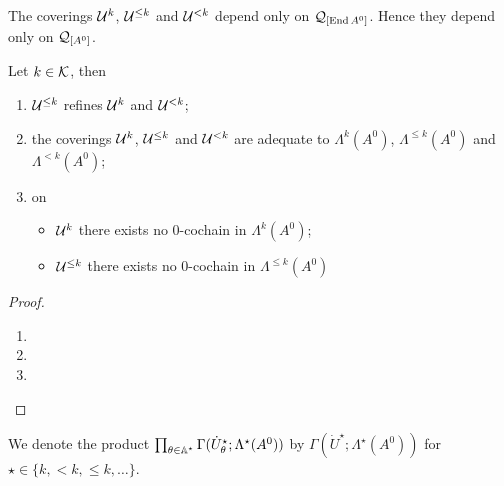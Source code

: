 \begin{rem}
  The coverings $\mathcal{U}^{k}$, $\mathcal{U}^{\leq k}$ and $\mathcal{U}^{<k}$ depend only on
  $\mathcal{Q}_{[\operatorname{End} A^0]}$. Hence they depend only on $\mathcal{Q}_{[A^0]}$.
\end{rem}
\begin{prop}
  Let $k\in\mathcal{K}$, then
  \begin{enumerate}
    \item $\mathcal{U}^{\leq k}$ refines $\mathcal{U}^{k}$ and $\mathcal{U}^{<k}$;
    \item the coverings $\mathcal{U}^{k}$, $\mathcal{U}^{\leq k}$ and $\mathcal{U}^{<k}$ are adequate
      to $\Lambda^k(A^0)$, $\Lambda^{\leq k}(A^0)$ and $\Lambda^{<k}(A^0)$;
    \item on
      \begin{itemize}
        \item $\mathcal{U}^k$ there exists no $0$-cochain in $\Lambda^k(A^0)$;
        \item $\mathcal{U}^{\leq k}$ there exists no $0$-cochain in
          $\Lambda^{\leq k}(A^0)$
      \end{itemize}
  \end{enumerate}
\end{prop}
\begin{proof}
  \begin{enumerate}
    \item \TODO{}
    \item \TODO{}
    \item \TODO{}
  \end{enumerate}
\end{proof}
We denote the product
$\prod_{\theta\in\mathbb{A}^\star}\Gamma(\dot U_\theta^\star;\Lambda^\star(A^0))$ by
$\Gamma(\dot U^\star;\Lambda^\star(A^0))$ for $\star\in\{k,<k,\leq k,\dots\}$.

